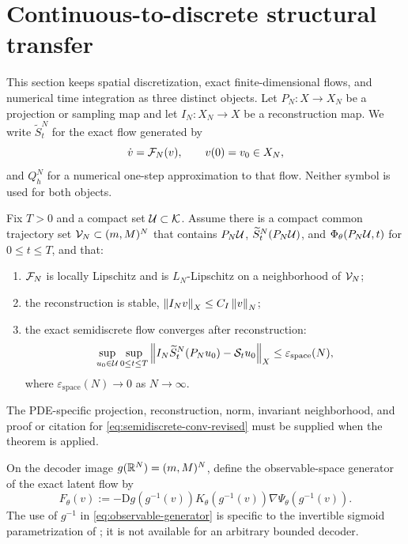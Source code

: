 \section{Continuous-to-discrete structural transfer}\label{sec:transfer}

This section keeps spatial discretization, exact finite-dimensional flows, and numerical time integration as three distinct objects. Let $P_N:X\to X_N$ be a projection or sampling map and let $I_N:X_N\to X$ be a reconstruction map. We write $\widetilde S_t^N$ for the exact flow generated by
\begin{equation}\label{eq:semidiscrete-scheme-revised}
\dot v=\mathcal{F}_N(v),\qquad v(0)=v_0\in X_N,
\end{equation}
and $Q_h^N$ for a numerical one-step approximation to that flow. Neither symbol is used for both objects.

\begin{assumption}\label{ass:semidiscrete}
Fix $T>0$ and a compact set $\mathcal{U}\subset\mathcal{K}$. Assume there is a compact common trajectory set $\mathcal{V}_N\subset(m,M)^N$ that contains $P_N\mathcal{U}$, $\widetilde S_t^N(P_N\mathcal{U})$, and $\Phi_{\theta}(P_N\mathcal{U},t)$ for $0\le t\le T$, and that:
\begin{enumerate}[label=(\roman*)]
    \item $\mathcal{F}_N$ is locally Lipschitz and is $L_N$-Lipschitz on a neighborhood of $\mathcal{V}_N$;
    \item the reconstruction is stable, $\left\lVert I_Nv \right\rVert_X\le C_I\left\lVert v \right\rVert_N$;
    \item the exact semidiscrete flow converges after reconstruction:
    \begin{equation}\label{eq:semidiscrete-conv-revised}
    \sup_{u_0\in\mathcal{U}}\sup_{0\le t\le T}
    \left\lVert I_N\widetilde S_t^N(P_Nu_0)-\mathcal{S}_tu_0 \right\rVert_X
    \le \varepsilon_{\mathrm{space}}(N),
    \end{equation}
    where $\varepsilon_{\mathrm{space}}(N)\to0$ as $N\to\infty$.
\end{enumerate}
The PDE-specific projection, reconstruction, norm, invariant neighborhood, and proof or citation for \eqref{eq:semidiscrete-conv-revised} must be supplied when the theorem is applied.
\end{assumption}

On the decoder image $g(\mathbb{R}^N)=(m,M)^N$, define the observable-space generator of the exact latent flow by
\begin{equation}\label{eq:observable-generator}
F_\theta(v):=-\mathrm{D}g(g^{-1}(v))K_\theta(g^{-1}(v))\nabla\Psi_\theta(g^{-1}(v)).
\end{equation}
The use of $g^{-1}$ in \eqref{eq:observable-generator} is specific to the invertible sigmoid parametrization of ; it is not available for an arbitrary bounded decoder.

